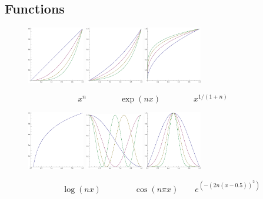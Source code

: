 \documentclass{beamer}
\begin{document}
\subsection{Functions}
\begin{frame}
  \begin{figure}
    \centering
    \includegraphics[width=2.5cm]{fig/Template1n.eps}
    \includegraphics[width=2.5cm]{fig/Template2n.eps}
    \includegraphics[width=2.5cm]{fig/Template3n.eps}
  \end{figure}
  \begin{equation*}
    x^n\qquad\qquad\exp(nx)\qquad\qquad x^{1/(1+n)}
  \end{equation*}
  \begin{figure}
    \includegraphics[width=2.5cm]{fig/Template4n.eps}
    \includegraphics[width=2.5cm]{fig/Template5n.eps}
    \includegraphics[width=2.5cm]{fig/Template6n.eps}
  \end{figure}
  \begin{equation*}
    \qquad\qquad\log(nx)\qquad\qquad\cos(n\pi x)\qquad e^{(-(2n(x-0.5))^2)}\qquad
  \end{equation*}
\end{frame}
\end{document}
